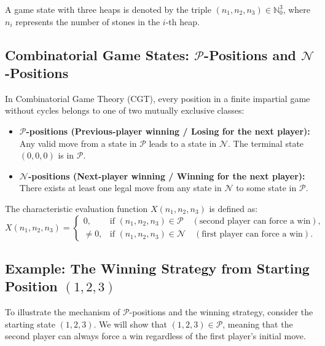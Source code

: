 ﻿\documentclass[a4paper]{article}
\begin{document}
A game state with three heaps is denoted by the triple $(n_1, n_2, n_3) \in \mathbb{N}_0^3$, where $n_i$ represents the number of stones in the $i$-th heap.

\subsection{Combinatorial Game States: $\mathcal{P}$-Positions and $\mathcal{N}$-Positions}
In Combinatorial Game Theory (CGT), every position in a finite impartial game without cycles belongs to one of two mutually exclusive classes:
\begin{itemize}
    \item \textbf{$\mathcal{P}$-positions (Previous-player winning / Losing for the next player):} Any valid move from a state in $\mathcal{P}$ leads to a state in $\mathcal{N}$. The terminal state $(0, 0, 0)$ is in $\mathcal{P}$.
    \item \textbf{$\mathcal{N}$-positions (Next-player winning / Winning for the next player):} There exists at least one legal move from any state in $\mathcal{N}$ to some state in $\mathcal{P}$.
\end{itemize}

The characteristic evaluation function $X(n_1, n_2, n_3)$ is defined as:
\begin{equation}
X(n_1, n_2, n_3) = 
\begin{cases}
0, & \text{if } (n_1, n_2, n_3) \in \mathcal{P} \quad (\text{second player can force a win}), \\
\ne 0, & \text{if } (n_1, n_2, n_3) \in \mathcal{N} \quad (\text{first player can force a win}).
\end{cases}
\end{equation}

\subsection{Example: The Winning Strategy from Starting Position $(1, 2, 3)$}
To illustrate the mechanism of $\mathcal{P}$-positions and the winning strategy, consider the starting state $(1, 2, 3)$. We will show that $(1, 2, 3) \in \mathcal{P}$, meaning that the second player can always force a win regardless of the first player's initial move.
\end{document}
